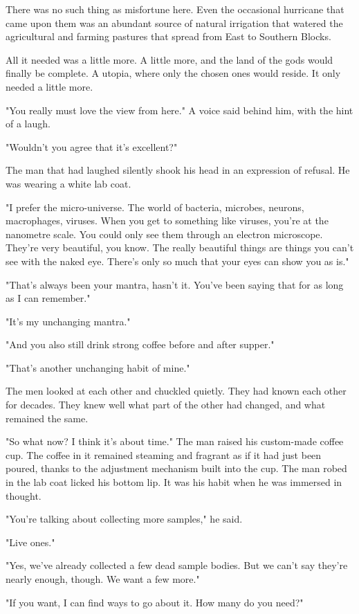 There was no such thing as misfortune here. Even the occasional
hurricane that came upon them was an abundant source of natural
irrigation that watered the agricultural and farming pastures that
spread from East to Southern Blocks.

All it needed was a little more. A little more, and the land of the gods
would finally be complete. A utopia, where only the chosen ones would
reside. It only needed a little more.

"You really must love the view from here." A voice said behind him, with
the hint of a laugh.

"Wouldn't you agree that it's excellent?"

The man that had laughed silently shook his head in an expression of
refusal. He was wearing a white lab coat.

"I prefer the micro-universe. The world of bacteria, microbes, neurons,
macrophages, viruses. When you get to something like viruses, you're at
the nanometre scale. You could only see them through an electron
microscope. They're very beautiful, you know. The really beautiful
things are things you can't see with the naked eye. There's only so much
that your eyes can show you as is."

"That's always been your mantra, hasn't it. You've been saying that for
as long as I can remember."

"It's my unchanging mantra."

"And you also still drink strong coffee before and after supper."

"That's another unchanging habit of mine."

The men looked at each other and chuckled quietly. They had known each
other for decades. They knew well what part of the other had changed,
and what remained the same.

"So what now? I think it's about time." The man raised his custom-made
coffee cup. The coffee in it remained steaming and fragrant as if it had
just been poured, thanks to the adjustment mechanism built into the cup.
The man robed in the lab coat licked his bottom lip. It was his habit
when he was immersed in thought.

"You're talking about collecting more samples," he said.

"Live ones."

"Yes, we've already collected a few dead sample bodies. But we can't say
they're nearly enough, though. We want a few more."

"If you want, I can find ways to go about it. How many do you need?"

